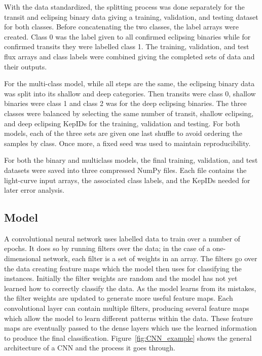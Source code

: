 With the data standardized, the splitting process was done separately for the transit and eclipsing binary data giving a training, validation, and testing dataset for both classes. Before concatenating the two classes, the label arrays were created. Class 0 was the label given to all confirmed eclipsing binaries while for confirmed transits they were labelled class 1. The training, validation, and test flux arrays and class labels were combined giving the completed sets of data and their outputs. 

For the multi-class model, while all steps are the same, the eclipsing binary data was split into its shallow and deep categories. Then transits were class 0, shallow binaries were class 1 and class 2 was for the deep eclipsing binaries. The three classes were balanced by selecting the same number of transit, shallow eclipsing, and deep eclipsing KepIDs for the training, validation and testing. For both models, each of the three sets are given one last shuffle to avoid ordering the samples by class. Once more, a fixed seed was used to maintain reproducibility.  

For both the binary and multiclass models, the final training, validation, and test datasets were saved into three compressed NumPy files. Each file contains the light-curve input arrays, the associated class labels, and the KepIDs needed for later error analysis. 

\subsection{Model}

A convolutional neural network uses labelled data to train over a number of epochs. It does so by running filters over the data; in the case of a one-dimensional network, each filter is a set of weights in an array. The filters go over the data creating feature maps which the model then uses for classifying the instances. Initially the filter weights are random and the model has not yet learned how to correctly classify the data. As the model learns from its mistakes, the filter weights are updated to generate more useful feature maps. Each convolutional layer can contain multiple filters, producing several feature maps which allow the model to learn different patterns within the data. These feature maps are eventually passed to the dense layers which use the learned information to produce the final classification. Figure~\ref{fig:CNN_example} shows the general architecture of a CNN and the process it goes through.

